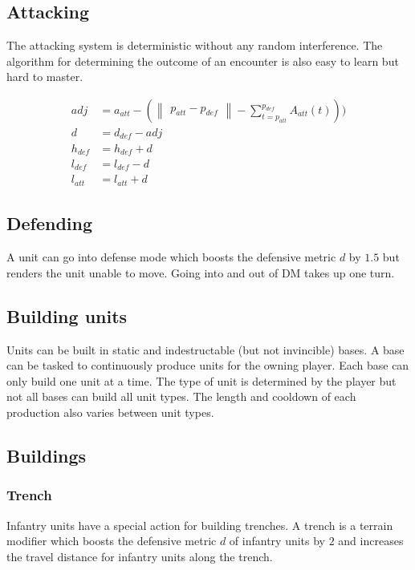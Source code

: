 \subsection{Attacking}
The attacking system is deterministic without any random interference. The algorithm for determining the outcome
of an encounter is also easy to learn but hard to master.

\begin{align}
    adj &= a_{att} - (\begin{Vmatrix}p_{att} - p_{def}\end{Vmatrix} - \sum_{t=p_{att}}^{p_{def}} A_{att}(t))) \\
    d &= d_{def} - adj \\
    h_{def} &= h_{def} + d \\
    l_{def} &= l_{def} - d \\ %
    l_{att} &= l_{att} + d
\end{align}

\subsection{Defending} %
A unit can go into defense mode which boosts the defensive metric $d$ by $1.5$ but renders the unit unable to move.
Going into and out of DM takes up one turn.
\subsection{Building units} %
Units can be built in static and indestructable (but not invincible) bases.
A base can be tasked to continuously produce units for the owning player. Each base can only build one unit
at a time. The type of unit is determined by the player but not all bases can build all unit types. The length and cooldown
of each production also varies between unit types.
\subsection{Buildings} %
\subsubsection{Trench}
Infantry units have a special action for building trenches. A trench is a terrain modifier which boosts the
defensive metric $d$ of infantry units by $2$ and increases the travel distance for infantry units along the trench.

